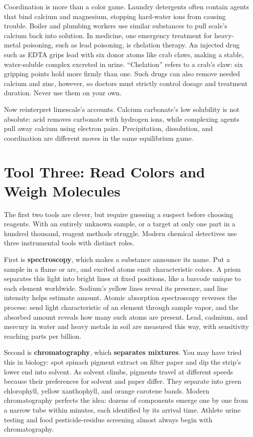 Coordination is more than a color game. Laundry detergents often contain agents that bind calcium and magnesium, stopping hard-water ions from causing trouble. Boiler and plumbing workers use similar substances to pull scale's calcium back into solution. In medicine, one emergency treatment for heavy-metal poisoning, such as lead poisoning, is chelation therapy. An injected drug such as EDTA grips lead with six donor atoms like crab claws, making a stable, water-soluble complex excreted in urine. ``Chelation'' refers to a crab's claw: six gripping points hold more firmly than one. Such drugs can also remove needed calcium and zinc, however, so doctors must strictly control dosage and treatment duration. Never use them on your own.

Now reinterpret limescale's accounts. Calcium carbonate's low solubility is not absolute: acid removes carbonate with hydrogen ions, while complexing agents pull away calcium using electron pairs. Precipitation, dissolution, and coordination are different moves in the same equilibrium game.

\section{Tool Three: Read Colors and Weigh Molecules}

The first two tools are clever, but require guessing a suspect before choosing reagents. With an entirely unknown sample, or a target at only one part in a hundred thousand, reagent methods struggle. Modern chemical detectives use three instrumental tools with distinct roles.

First is \textbf{spectroscopy}, which makes a substance announce its name. Put a sample in a flame or arc, and excited atoms emit characteristic colors. A prism separates this light into bright lines at fixed positions, like a barcode unique to each element worldwide. Sodium's yellow lines reveal its presence, and line intensity helps estimate amount. Atomic absorption spectroscopy reverses the process: send light characteristic of an element through sample vapor, and the absorbed amount reveals how many such atoms are present. Lead, cadmium, and mercury in water and heavy metals in soil are measured this way, with sensitivity reaching parts per billion.

Second is \textbf{chromatography}, which \textbf{separates mixtures}. You may have tried this in biology: spot spinach pigment extract on filter paper and dip the strip's lower end into solvent. As solvent climbs, pigments travel at different speeds because their preferences for solvent and paper differ. They separate into green chlorophyll, yellow xanthophyll, and orange carotene bands. Modern chromatography perfects the idea: dozens of components emerge one by one from a narrow tube within minutes, each identified by its arrival time. Athlete urine testing and food pesticide-residue screening almost always begin with chromatography.


